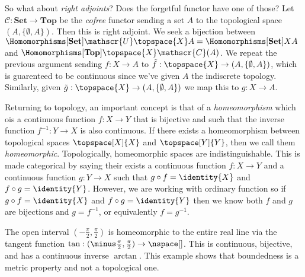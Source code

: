 \documentclass{book}                                                           %
\begin{document}
                \par\hfill\par
                So what about \textit{right adjoints}? Does the forgetful
                functor have one of those? Let
                $\mathscr{C}:\textbf{Set}\rightarrow\textbf{Top}$ be the
                \textit{cofree} functor sending a set $A$ to the topological
                space $(A,\{\emptyset,A\})$. Then this is right adjoint. We seek
                a bijection between
                $\Homomorphisms[\textbf{Set}]{\mathscr{U}\topspace{X}}{A}%
                =\Homomorphisms[\textbf{Set}]{X}{A}$ and
                $\Homomorphisms[\textbf{Top}]{\topspace{X}}{\mathscr{C}(A)}$. We
                repeat the previous argument sending $f:X\rightarrow{A}$ to
                $\tilde{f}:\topspace{X}\rightarrow(A,\{\emptyset,A\})$, which is
                guarenteed to be continuous since we've given $A$ the indiscrete
                topology. Similarly, given
                $\tilde{g}:\topspace{X}\rightarrow(A,\{\emptyset,A\})$ we map
                this to $g:X\rightarrow{A}$.
                \par\hfill\par
                Returning to topology, an important concept is that of a
                \textit{homeomorphism} which ois a continuous function
                $f:X\rightarrow{Y}$ that is bijective and such that the inverse
                function $f^{\minus{1}}:Y\rightarrow{X}$ is also continuous.
                If there exists a homeomorphism between topological spaces
                $\topspace[X]{X}$ and $\topspace[Y]{Y}$, then we call them
                \textit{homeomorphic}. Topologically, homeomorphic spaces are
                indistinguishable.
                This is made categorical by saying their exists a continuous
                function $f:X\rightarrow{Y}$ and a continuous function
                $g:Y\rightarrow{X}$ such that $g\circ{f}=\identity{X}$ and
                $f\circ{g}=\identity{Y}$. However, we are working with ordinary
                function so if $g\circ{f}=\identity{X}$ and $f\circ{g}=\identity{Y}$
                then we know both $f$ and $g$ are bijections and
                $g=f^{\minus{1}}$, or equivalently $f=g^{\minus{1}}$.
                \begin{example}
                    The open interval $(\minus\frac{\pi}{2},\frac{\pi}{2})$ is
                    homeomorphic to the entire real line via the tangent
                    function $\tan:(\minus\frac{\pi}{2},\frac{\pi}{2})%
                    \rightarrow\nspace[]$. This is continuous, bijective, and
                    has a continuous inverse $\arctan$. This example shows that
                    boundedness is a metric property and not a topological one.
                \end{example}
\end{document}

